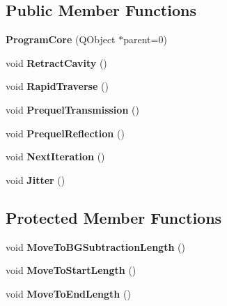 \subsection*{Public Member Functions}
\begin{DoxyCompactItemize}
\item 
{\bfseries Program\+Core} (Q\+Object $\ast$parent=0)\hypertarget{classetig_1_1_program_core_a0f0556682ac02580cf51c679af994183}{}\label{classetig_1_1_program_core_a0f0556682ac02580cf51c679af994183}

\item 
void {\bfseries Retract\+Cavity} ()\hypertarget{classetig_1_1_program_core_a254509de2bfaf73b4dfa9442b55ea394}{}\label{classetig_1_1_program_core_a254509de2bfaf73b4dfa9442b55ea394}

\item 
void {\bfseries Rapid\+Traverse} ()\hypertarget{classetig_1_1_program_core_a6a1be8a5e7abf50fdb4a896137bc505a}{}\label{classetig_1_1_program_core_a6a1be8a5e7abf50fdb4a896137bc505a}

\item 
void {\bfseries Prequel\+Transmission} ()\hypertarget{classetig_1_1_program_core_a1fab0d46ede7eb2304e586d9375732f7}{}\label{classetig_1_1_program_core_a1fab0d46ede7eb2304e586d9375732f7}

\item 
void {\bfseries Prequel\+Reflection} ()\hypertarget{classetig_1_1_program_core_aeb11b8b520d4f0224713dbd5d983d636}{}\label{classetig_1_1_program_core_aeb11b8b520d4f0224713dbd5d983d636}

\item 
void {\bfseries Next\+Iteration} ()\hypertarget{classetig_1_1_program_core_a34d16d1c70c2d45a1fcbad1902c9de21}{}\label{classetig_1_1_program_core_a34d16d1c70c2d45a1fcbad1902c9de21}

\item 
void {\bfseries Jitter} ()\hypertarget{classetig_1_1_program_core_a069a482c22c525a4081225ba3bec2c0a}{}\label{classetig_1_1_program_core_a069a482c22c525a4081225ba3bec2c0a}

\end{DoxyCompactItemize}
\subsection*{Protected Member Functions}
\begin{DoxyCompactItemize}
\item 
void {\bfseries Move\+To\+B\+G\+Subtraction\+Length} ()\hypertarget{classetig_1_1_program_core_a3a405439926758a6da7658180659cfec}{}\label{classetig_1_1_program_core_a3a405439926758a6da7658180659cfec}

\item 
void {\bfseries Move\+To\+Start\+Length} ()\hypertarget{classetig_1_1_program_core_a4f2760f926277d8829d3f65cbd95260c}{}\label{classetig_1_1_program_core_a4f2760f926277d8829d3f65cbd95260c}

\item 
void {\bfseries Move\+To\+End\+Length} ()\hypertarget{classetig_1_1_program_core_a11429f35f59e9540b886163c6a7eb211}{}\label{classetig_1_1_program_core_a11429f35f59e9540b886163c6a7eb211}

\end{DoxyCompactItemize}
